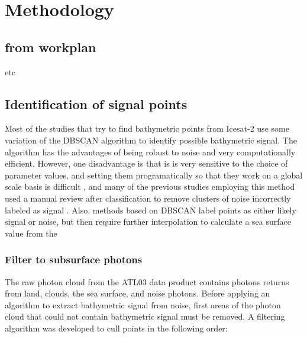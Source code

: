 \chapter{Methodology}

\section*{from workplan}
etc

\section{Identification of signal points}
Most of the studies that try to find bathymetric points from Icesat-2 use some variation of the DBSCAN algorithm to identify possible bathymetric signal. The algorithm has the advantages of being robust to noise \cite{} and very computationally efficient. However, one disadvantage is that is is very sensitive to the choice of parameter values, and setting them programatically so that they work on a global scale basis is difficult \cite{} , and many of the previous studies employing this method used a manual review after classification to remove clusters of noise incorrectly labeled as signal \parencite{} . Also, methods based on DBSCAN label points as either likely signal or noise, but then require further interpolation to calculate a sea surface value from the 


\subsection{Filter to subsurface photons}

The raw photon cloud from the ATL03 data product contains photons returns from land, clouds, the sea surface, and noise photons. Before applying an algorithm to extract bathymetric signal from noise, first areas of the photon cloud that could not contain bathymetric signal must be removed. A filtering algorithm was developed to cull points in the following order:

